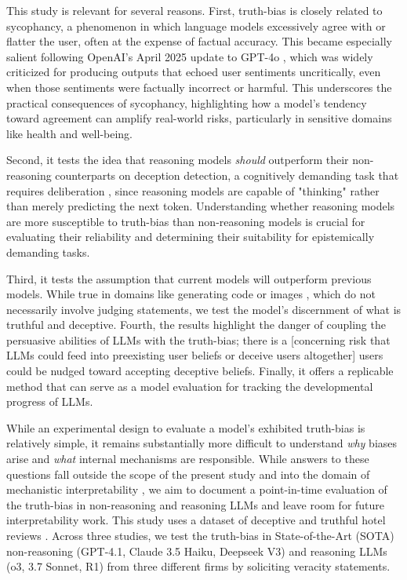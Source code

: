 \documentclass{article}
\begin{document}
This study is relevant for several reasons. First, truth-bias is closely related to sycophancy, a phenomenon in which language models excessively agree with or flatter the user, often at the expense of factual accuracy. This became especially salient following OpenAI's April 2025 update to GPT-4o \citep{openai_sycophancy_4o_2025}, which was widely criticized for producing outputs that echoed user sentiments uncritically, even when those sentiments were factually incorrect or harmful. This underscores the practical consequences of sycophancy, highlighting how a model's tendency toward agreement can amplify real-world risks, particularly in sensitive domains like health and well-being. 

Second, it tests the idea that reasoning models \textit{should} outperform their non-reasoning counterparts on deception detection, a cognitively demanding task that requires deliberation \citep{mccornack_deception_1986}, since reasoning models are capable of "thinking" rather than merely predicting the next token. Understanding whether reasoning models are more susceptible to truth-bias than non-reasoning models is crucial for evaluating their reliability and determining their suitability for epistemically demanding tasks. 

Third, it tests the assumption that current models will outperform previous models. While true in domains like generating code or images \citep{handa2025economictasksperformedai, anthropic_anthropic_2025}, which do not necessarily involve judging statements, we test the model's discernment of what is truthful and deceptive. Fourth, the results highlight the danger of coupling the persuasive abilities of LLMs with the truth-bias; there is a [concerning risk that LLMs could feed into preexisting user beliefs or deceive users altogether] users could be nudged toward accepting deceptive beliefs. Finally, it offers a replicable method that can serve as a model evaluation for tracking the developmental progress of LLMs.

While an experimental design to evaluate a model's exhibited truth-bias is relatively simple, it remains substantially more difficult to understand \textit{why} biases arise and \textit{what} internal mechanisms are responsible. While answers to these questions fall outside the scope of the present study and into the domain of mechanistic interpretability \citep{Nanda2023ProgressMF}, we aim to document a point-in-time evaluation of the truth-bias in non-reasoning and reasoning LLMs and leave room for future interpretability work. This study uses a dataset of deceptive and truthful hotel reviews \citep{ott_finding_2011}. Across three studies, we test the truth-bias in State-of-the-Art (SOTA) non-reasoning (GPT-4.1, Claude 3.5 Haiku, Deepseek V3) and reasoning LLMs (o3, 3.7 Sonnet, R1) from three different firms by soliciting veracity statements.
\end{document}
